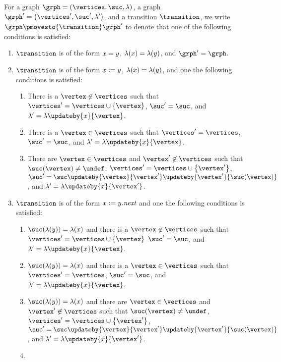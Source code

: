 For a graph $\grph=\tuple{\vertices,\suc,\labeling}$,
a graph $\grph'=\tuple{\vertices',\suc',\labeling'}$,
and a transition $\transition$,
we write $\grph\pmovesto{\transition}\grph'$ to denote that
one of the following conditions is satisfied:
\begin{enumerate}
\item
$\transition$ is of the form $x=y$,
$\lambda(x)=\lambda(y)$, and $\grph'=\grph$.
\item
$\transition$ is of the form $x:=y$,
$\lambda(x)=\lambda(y)$, and one the following conditions is satisfied:
\begin{enumerate}
\item
\label{sass1}
There is a $\vertex\not\in\vertices$ such that
$\vertices'=\vertices\cup\set{\vertex}$,
$\suc'=\suc$, and $\labeling'=\labeling\updateby{\xvar}{\vertex}$.
\item
\label{sass2}
There is a $\vertex\in\vertices$ such that
$\vertices'=\vertices$,
$\suc'=\suc$, and $\labeling'=\labeling\updateby{\xvar}{\vertex}$.
\item
\label{sass3}
There are $\vertex\in\vertices$ and $\vertex'\not\in\vertices$ such that
$\suc(\vertex)\neq\undef$,
$\vertices'=\vertices\cup\set{\vertex'}$,
$\suc'=\suc\updateby{\vertex}{\vertex'}\updateby{\vertex'}{\suc(\vertex)}$, and
$\labeling'=\labeling\updateby{\xvar}{\vertex'}$.
\end{enumerate}
\item
$\transition$ is of the form $x:=y.{\it next}$
and one the following conditions is satisfied:
\begin{enumerate}
\item
\label{nass1}
$\suc(\labeling(\yvar))=\labeling(\xvar)$ and
there is a $\vertex\not\in\vertices$ such that
$\vertices'=\vertices\cup\set{\vertex}$ 
$\suc'=\suc$, and $\labeling'=\labeling\updateby{\xvar}{\vertex}$.
\item
\label{nass2}
$\suc(\labeling(\yvar))=\labeling(\xvar)$ and
there is a $\vertex\in\vertices$ such that
$\vertices'=\vertices$,
$\suc'=\suc$, and $\labeling'=\labeling\updateby{\xvar}{\vertex}$.
\item
\label{nass3}
$\suc(\labeling(\yvar))=\labeling(\xvar)$ and
there are $\vertex\in\vertices$ and $\vertex'\not\in\vertices$ such that
$\suc(\vertex)\neq\undef$,
$\vertices'=\vertices\cup\set{\vertex'}$,
$\suc'=\suc\updateby{\vertex}{\vertex'}\updateby{\vertex'}{\suc(\vertex)}$, and
$\labeling'=\labeling\updateby{\xvar}{\vertex'}$.
\item

\end{enumerate}
\end{enumerate}
